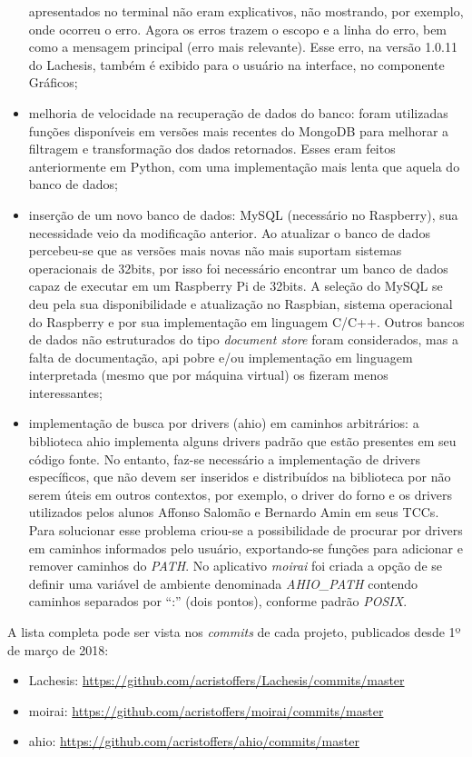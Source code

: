 \begin{itemize}
	      apresentados no terminal não eram explicativos, não mostrando, por
	      exemplo, onde ocorreu o erro. Agora os erros trazem o escopo e a linha
	      do erro, bem como a mensagem principal (erro mais relevante). Esse
	      erro, na versão 1.0.11 do Lachesis, também é exibido para o usuário na
	      interface, no componente Gráficos;
	\item melhoria de velocidade na recuperação de dados do banco: foram
	      utilizadas funções disponíveis em versões mais recentes do MongoDB
	      para melhorar a filtragem e transformação dos dados retornados. Esses
	      eram feitos anteriormente em Python, com uma implementação mais lenta
	      que aquela do banco de dados;
	\item inserção de um novo banco de dados: MySQL (necessário no Raspberry),
	      sua necessidade veio da modificação anterior. Ao atualizar o banco de
	      dados percebeu-se que as versões mais novas não mais suportam sistemas
	      operacionais de 32bits, por isso foi necessário encontrar um banco de
	      dados capaz de executar em um Raspberry Pi de 32bits. A seleção do
	      MySQL se deu pela sua disponibilidade e atualização no Raspbian,
	      sistema operacional do Raspberry e por sua implementação em linguagem
	      C/C++. Outros bancos de dados não estruturados do tipo
	      \textit{document store} foram considerados, mas a falta de
	      documentação, api pobre e/ou implementação em linguagem interpretada
	      (mesmo que por máquina virtual) os fizeram menos interessantes;
	\item implementação de busca por drivers (ahio) em caminhos arbitrários: a
	      biblioteca ahio implementa alguns drivers padrão que estão presentes
	      em seu código fonte. No entanto, faz-se necessário a implementação de
	      drivers específicos, que não devem ser inseridos e distribuídos na
	      biblioteca por não serem úteis em outros contextos, por exemplo, o
	      driver do forno e os drivers utilizados pelos alunos Affonso Salomão e
	      Bernardo Amin em seus TCCs. Para solucionar esse problema criou-se a
	      possibilidade de procurar por drivers em caminhos informados pelo
	      usuário, exportando-se funções para adicionar e remover caminhos do
	      \textit{PATH}. No aplicativo \textit{moirai} foi criada a opção de se
	      definir uma variável de ambiente denominada \textit{AHIO\_PATH}
	      contendo caminhos separados por \enquote{:} (dois pontos), conforme
	      padrão \textit{POSIX}.
\end{itemize}

A lista completa pode ser vista nos \textit{commits} de cada projeto, publicados
desde 1º de março de 2018:

\begin{itemize}
	\item Lachesis: \url{https://github.com/acristoffers/Lachesis/commits/master}
	\item moirai: \url{https://github.com/acristoffers/moirai/commits/master}
	\item ahio: \url{https://github.com/acristoffers/ahio/commits/master}
\end{itemize}

